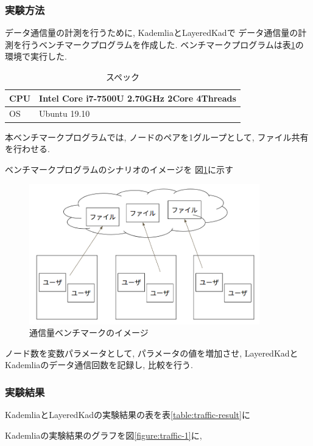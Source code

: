 \documentclass[sotsuron]{jcsie}
\begin{document}
\subsubsection{実験方法}
データ通信量の計測を行うために, KademliaとLayeredKadで
データ通信量の計測を行うベンチマークプログラムを作成した.
ベンチマークプログラムは表\ref{table:spec-note}の環境で実行した.

\begin{table}[H]
	\caption{スペック}	
	\centering
	\label{table:spec-note}
	\begin{tabular}{|l|l|}
		\hline
		CPU &   
		Intel Core i7-7500U 2.70GHz 2Core 4Threads\\ 
		\hline	
		OS  &   
		Ubuntu 19.10 \\ 
		\hline
	\end{tabular}	
\end{table}

本ベンチマークプログラムでは, ノードのペアを1グループとして, 
ファイル共有を行わせる.

ベンチマークプログラムのシナリオのイメージを
図\ref{fig:trafficBenchmark}に示す

\begin{figure}[H]
	\centering
	\includegraphics[width=10cm]{./assets/image/traffic_benchmark.png}
	\caption{通信量ベンチマークのイメージ}
	\label{fig:trafficBenchmark}
\end{figure}

ノード数を変数パラメータとして, パラメータの値を増加させ, 
LayeredKadとKademliaのデータ通信回数を記録し, 比較を行う.

\subsubsection{実験結果}
KademliaとLayeredKadの実験結果の表を表\ref{table:traffic-result}に

Kademliaの実験結果のグラフを図\ref{figure:traffic-1}に, 
\end{document}
